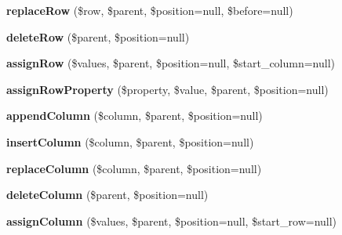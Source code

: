 \begin{DoxyCompactItemize}
\item 
\hypertarget{classclsTableUpdater_a561fd6ea2d77608d6afc7440585458e2}{
{\bfseries replaceRow} (\$row, \$parent, \$position=null, \$before=null)}
\label{classclsTableUpdater_a561fd6ea2d77608d6afc7440585458e2}

\item 
\hypertarget{classclsTableUpdater_a29bebaefb629ab2a03f855f06e816c9b}{
{\bfseries deleteRow} (\$parent, \$position=null)}
\label{classclsTableUpdater_a29bebaefb629ab2a03f855f06e816c9b}

\item 
\hypertarget{classclsTableUpdater_acfb6c8ccb236a0b1eda45547a5ddbc73}{
{\bfseries assignRow} (\$values, \$parent, \$position=null, \$start\_\-column=null)}
\label{classclsTableUpdater_acfb6c8ccb236a0b1eda45547a5ddbc73}

\item 
\hypertarget{classclsTableUpdater_a1ca00fab940b0df67c2a77ee882b1772}{
{\bfseries assignRowProperty} (\$property, \$value, \$parent, \$position=null)}
\label{classclsTableUpdater_a1ca00fab940b0df67c2a77ee882b1772}

\item 
\hypertarget{classclsTableUpdater_a5d13777bd06e14260d82be8cce37b18f}{
{\bfseries appendColumn} (\$column, \$parent, \$position=null)}
\label{classclsTableUpdater_a5d13777bd06e14260d82be8cce37b18f}

\item 
\hypertarget{classclsTableUpdater_a8b51b216344d3ce2538da480928081a5}{
{\bfseries insertColumn} (\$column, \$parent, \$position=null)}
\label{classclsTableUpdater_a8b51b216344d3ce2538da480928081a5}

\item 
\hypertarget{classclsTableUpdater_aa1f0d4b818737c96a4287ad4e68ceabb}{
{\bfseries replaceColumn} (\$column, \$parent, \$position=null)}
\label{classclsTableUpdater_aa1f0d4b818737c96a4287ad4e68ceabb}

\item 
\hypertarget{classclsTableUpdater_afb55b241ef83381493e8ae332ef7c10f}{
{\bfseries deleteColumn} (\$parent, \$position=null)}
\label{classclsTableUpdater_afb55b241ef83381493e8ae332ef7c10f}

\item 
\hypertarget{classclsTableUpdater_a0552f8d76a260d260bd6dd5909712be0}{
{\bfseries assignColumn} (\$values, \$parent, \$position=null, \$start\_\-row=null)}
\label{classclsTableUpdater_a0552f8d76a260d260bd6dd5909712be0}


\end{DoxyCompactItemize}
